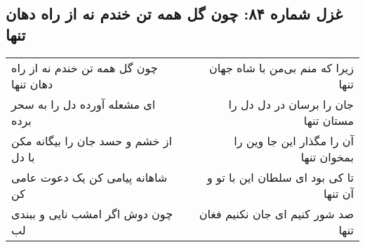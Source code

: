 \begin{center}
\section*{غزل شماره ۸۴: چون گل همه تن خندم نه از راه دهان تنها}
\label{sec:0084}
\begin{longtable}{l p{0.5cm} r}
چون گل همه تن خندم نه از راه دهان تنها
&&
زیرا که منم بی‌من با شاه جهان تنها
\\
ای مشعله آورده دل را به سحر برده
&&
جان را برسان در دل دل را مستان تنها
\\
از خشم و حسد جان را بیگانه مکن با دل
&&
آن را مگذار این جا وین را بمخوان تنها
\\
شاهانه پیامی کن یک دعوت عامی کن
&&
تا کی بود ای سلطان این با تو و آن تنها
\\
چون دوش اگر امشب نایی و ببندی لب
&&
صد شور کنیم ای جان نکنیم فغان تنها
\\
\end{longtable}
\end{center}
